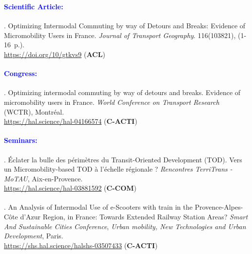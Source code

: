 \begin{refsegment}
     \newpage
     
    \begin{tcolorbox}[colback=white!5!white,
                      colframe=blue!75!blue,
                      title=Valorization
                      \\
                      Chapter~5]
\Large{\textcolor{blue}{\textbf{Scientific Article:}}}
    \\\\
\small{\textcolor{blue}{\textcite{moinse_optimizing_2024}}. Optimizing Intermodal Commuting by way of Detours and Breaks: Evidence of Micromobility Users in France. \textsl{Journal of Transport Geography}. 116(103821), (1-16~p.).
\\
\footnotesize{\url{https://doi.org/10/gtkvs9}} (\textbf{ACL})}
    \\\\
\Large{\textcolor{blue}{\textbf{Congress:}}}
    \\\\
\small{\textcolor{blue}{\textcite{moinse_optimizing_2023}}. Optimizing intermodal commuting by way of detours and breaks. Evidence of micromobility users in France. \textsl{World Conference on Transport Research} (WCTR), Montréal. 
\\
\footnotesize{\url{https://hal.science/hal-04166574}} (\textbf{C-ACTI})}
    \\\\
\Large{\textcolor{blue}{\textbf{Seminars:}}}
    \\\\
\small{\textcolor{blue}{\textcite{moinse_eclater_2022}}. Éclater la bulle des périmètres du Transit-Oriented Development (TOD). Vers un Micromobility-based TOD à l'échelle régionale ? \textsl{Rencontres TerriTrans - MoTAU}, Aix-en-Provence. 
\\
\footnotesize{\url{https://hal.science/hal-03881592}} (\textbf{C-COM})}
    \\\\
\small{\textcolor{blue}{\textcite{moinse_analysis_2021}}. An Analysis of Intermodal Use of e-Scooters with train in the Provence-Alpes-Côte d’Azur Region, in France: Towards Extended Railway Station Areas? \textsl{Smart And Sustainable Cities Conference}, \textsl{Urban mobility, New Technologies and Urban Development}, Paris.
\\
\footnotesize{\url{https://shs.hal.science/halshs-03507433}} (\textbf{C-ACTI})}

\end{tcolorbox}
\end{refsegment}
